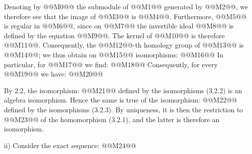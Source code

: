 Denoting by @@M0@@ the submodule of @@M1@@ generated by @@M2@@, we therefore see that the image of @@M3@@ is @@M4@@. Furthermore, @@M5@@ is regular in @@M6@@, since on @@M7@@ the invertible ideal @@M8@@ is defined by the equation @@M9@@. The kernel of @@M10@@ is therefore @@M11@@. Consequently, the @@M12@@-th homology group of @@M13@@ is @@M14@@; we thus obtain on @@M15@@ isomorphisms:
@@M16@@
In particular, for @@M17@@ we find:
@@M18@@
Consequently, for every @@M19@@ we have:
@@M20@@

By 2.2, the isomorphism:
@@M21@@
defined by the isomorphisms (3.2.2) is an algebra isomorphism. Hence the same is true of the isomorphism:
@@M22@@
defined by the isomorphisms (3.2.3). By uniqueness, it is then the restriction to @@M23@@ of the homomorphism (3.2.1), and the latter is therefore an isomorphism.

ii) Consider the exact sequence:
@@M24@@
